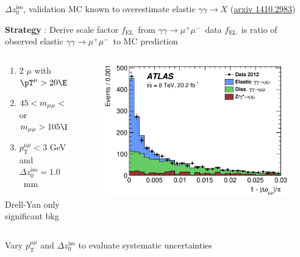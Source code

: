 \documentclass[10pt]{beamer}
\newcommand*{\yymumu}{\ensuremath{\gamma\gamma \to \mu^+\mu^-}}
\newcommand*{\mmumu}{\ensuremath{m_{\mu\mu}}}
\newcommand*{\pTmumu}{\ensuremath{p_{\textrm{T}}^{\mu\mu}}}
\newcommand*{\DZ}{\ensuremath{\Delta z_0^{\mathrm{iso}}}}
\newcommand*{\fEL}{\ensuremath{f_{\mathrm{EL}}}}
\begin{document}
\begin{frame}{\DZ, validation}
\centering
{\large\color{blue} MC known to overestimate elastic $\gamma\gamma\to X$ (\href{http://arxiv.org/abs/1410.2983}{arxiv 1410.2983})}
\begin{outline}
\1 {\bf Strategy} : Derive scale factor \fEL\ from \yymumu\ data 
	\2 \fEL\ is ratio of observed elastic \yymumu\ to MC prediction 
\end{outline}
\begin{columns}
	\begin{column}{0.45\linewidth}
\begin{tcolorbox}[title=\yymumu\ Selection, width=\linewidth, colback=white,colframe=red!50!white,nobeforeafter,tcbox raise base,top=0pt,left=0pt,right=0pt,bottom=0pt]
\begin{enumerate}
\item 2 $\mu$ with $\pT^{\mu} > 20\GeV$
\item $45 < \mmumu < 75\GeV$ or $\mmumu>105\GeV$ 
\item $\pTmumu< 3$ GeV and $\DZ = 1.0$~mm 
\end{enumerate}
Drell-Yan only significant bkg
\end{tcolorbox}
\vspace*{-\baselineskip}
	\end{column}
	\begin{column}{0.55\linewidth}
\begin{figure}
 \includegraphics[width=\linewidth]{figures/dilepton_3shapes_Washington_filled.eps} 
\end{figure}
	\end{column}
\end{columns}
\begin{outline}
\1 Vary $\pTmumu$ and $\DZ$ to evaluate systematic uncertainties 
\end{outline}
\vspace*{-0.3\baselineskip}


\end{frame}
\end{document}
